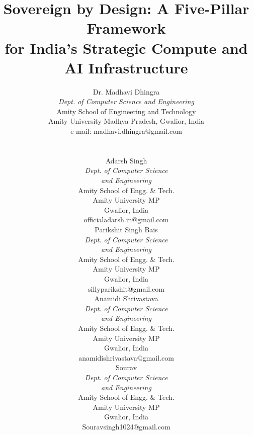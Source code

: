 \documentclass[conference]{IEEEtran}
\begin{document}
\title{\fontsize{17pt}{21pt}\selectfont Sovereign by Design: A Five-Pillar Framework\\for India's Strategic Compute and AI Infrastructure}

\author{
\parbox{0.7\linewidth}{\centering
  {\small Dr. Madhavi Dhingra}\\[1pt]
  {\footnotesize
  \textit{Dept. of Computer Science and Engineering}\\
  Amity School of Engineering and Technology\\
  Amity University Madhya Pradesh, Gwalior, India\\
  e-mail: madhavi.dhingra@gmail.com}
}
\\[12pt]
\parbox{0.235\linewidth}{\centering
  {\small Adarsh Singh}\\[1pt]
  {\footnotesize
  \textit{Dept. of Computer Science}\\
  \textit{and Engineering}\\
  Amity School of Engg. \& Tech.\\
  Amity University MP\\
  Gwalior, India\\
  officialadarsh.in@gmail.com}
}\hfil
\parbox{0.235\linewidth}{\centering
  {\small Parikshit Singh Bais}\\[1pt]
  {\footnotesize
  \textit{Dept. of Computer Science}\\
  \textit{and Engineering}\\
  Amity School of Engg. \& Tech.\\
  Amity University MP\\
  Gwalior, India\\
  sillyparikshit@gmail.com}
}\hfil
\parbox{0.235\linewidth}{\centering
  {\small Anamidi Shrivastava}\\[1pt]
  {\footnotesize
  \textit{Dept. of Computer Science}\\
  \textit{and Engineering}\\
  Amity School of Engg. \& Tech.\\
  Amity University MP\\
  Gwalior, India\\
  anamidishrivastava@gmail.com}
}\hfil
\parbox{0.235\linewidth}{\centering
  {\small Sourav}\\[1pt]
  {\footnotesize
  \textit{Dept. of Computer Science}\\
  \textit{and Engineering}\\
  Amity School of Engg. \& Tech.\\
  Amity University MP\\
  Gwalior, India\\
  Souravsingh1024@gmail.com}
}
}
\end{document}
